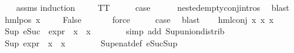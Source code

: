 \begin{isabellebody}
%
\isadelimproof
\ \ %
\endisadelimproof
%
\isatagproof
{}\isamarkupfalse%
\ assms\isanewline
{}\isamarkupfalse%
{\isacharparenleft}{\kern0pt}induction\ {\isasymphi}{\isacharparenright}{\kern0pt}\isanewline
\ \ \isamarkupfalse%
\ TT\isanewline
\ \ \isamarkupfalse%
\ \isamarkupfalse%
\ {\isacharquery}{\kern0pt}case\isanewline
\ \ \ \ \isamarkupfalse%
\ nested{\isacharunderscore}{\kern0pt}empty{\isacharunderscore}{\kern0pt}conj{\isachardot}{\kern0pt}intros{\isacharparenleft}{\kern0pt}{}{\isacharparenright}{\kern0pt}\ \isamarkupfalse%
\ blast\isanewline
{}\isamarkupfalse%
\isanewline
\ \ \isamarkupfalse%
\ {\isacharparenleft}{\kern0pt}hml{\isacharunderscore}{\kern0pt}pos\ x{}\ {\isasymphi}{\isacharparenright}{\kern0pt}\isanewline
\ \ \isamarkupfalse%
\ False\ \isanewline
\ \ \ \ \isamarkupfalse%
\ force\isanewline
\ \ \isamarkupfalse%
\ \isamarkupfalse%
\ {\isacharquery}{\kern0pt}case\ \isamarkupfalse%
\ blast\isanewline
{}\isamarkupfalse%
\isanewline
\ \ \isamarkupfalse%
\ {\isacharparenleft}{\kern0pt}hml{\isacharunderscore}{\kern0pt}conj\ x{}\ x{}\ x{}{\isacharparenright}{\kern0pt}\isanewline
\ \ \isamarkupfalse%
\ {\isachardoublequoteopen}Sup\ {\isacharparenleft}{\kern0pt}{\isacharparenleft}{\kern0pt}eSuc\ {\isasymcirc}\ expr{\isacharunderscore}{\kern0pt}{}\ {\isasymcirc}\ x{}{\isacharparenright}{\kern0pt}\ {\isacharbackquote}{\kern0pt}\ x{}{\isacharparenright}{\kern0pt}\ {\isasymle}\ {}{\isachardoublequoteclose}\isanewline
\ \ \ \ \isamarkupfalse%
\ {\isacharparenleft}{\kern0pt}simp\ add{\isacharcolon}{\kern0pt}\ Sup{\isacharunderscore}{\kern0pt}union{\isacharunderscore}{\kern0pt}distrib{\isacharparenright}{\kern0pt}\isanewline
\ \ \isamarkupfalse%
\ {\isachardoublequoteopen}Sup\ {\isacharparenleft}{\kern0pt}{\isacharparenleft}{\kern0pt}expr{\isacharunderscore}{\kern0pt}{}\ {\isasymcirc}\ x{}{\isacharparenright}{\kern0pt}\ {\isacharbackquote}{\kern0pt}\ x{}{\isacharparenright}{\kern0pt}\ {\isasymle}\ {}{\isachardoublequoteclose}\isanewline
\ \ \ \ \isamarkupfalse%
\ Sup{\isacharunderscore}{\kern0pt}enat{\isacharunderscore}{\kern0pt}def\ eSuc{\isacharunderscore}{\kern0pt}Sup\isanewline

\end{isabellebody}

